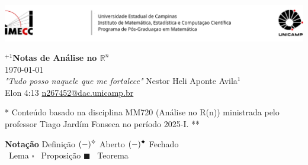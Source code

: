 \documentclass[a4paper, 17pt]{extarticle}
\begin{document}
\setlength{\columnsep}{1in}


\-\vspace{-1.3cm} 

\par\noindent \includegraphics[width = \linewidth]{Imagens/Header.png} 


\begin{center} %
{%
 \LARGE \textbf{\(^{+1}\)Notas de Análise no \(\mathbb{R}^n\)}} \vspace{0.1in}   \\
 { \today }\\ 
 {\small
 \vspace{0.4cm}\emph{"Tudo posso naquele que me fortalece" }\hfill Nestor Heli Aponte Avila\(^{1}\) \\ 
  
Elon 4:13 \hfill \href{mailto:n267452@dac.unicamp.br}{\url{n267452@dac.unicamp.br}}} %
\end{center} %
\- \vspace{-1cm}

{\small ** Conteúdo basado na disciplina MM720 (Análise no R(n)) ministrada pelo professor Tiago Jardím Fonseca no período 2025-I. **\vspace{0.3cm}}%


{\large \textbf{Notação}} \hfill {}  Definição \hfill \((-)^{\text{\ding{71}}}\)  Aberto \hfill  \((-)^{\text{\ding{70}}}\) Fechado \\ 
\- \hspace{4.7cm}{\scriptsize$\square$} \ Lema \hspace{2.9cm} {\large$\square$} \ Proposição \hspace{1.3cm}  {\large $\blacksquare$}  \ Teorema
\end{document}
